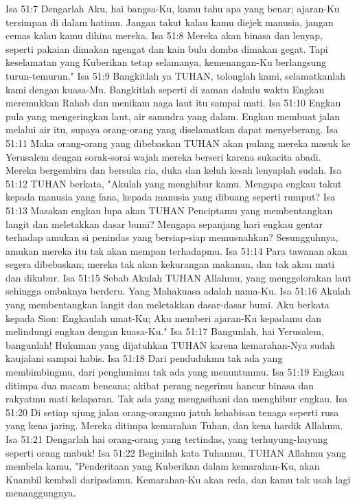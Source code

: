 Isa 51:7  Dengarlah Aku, hai bangsa-Ku, kamu tahu apa yang benar; ajaran-Ku tersimpan di dalam hatimu. Jangan takut kalau kamu diejek manusia, jangan cemas kalau kamu dihina mereka.
Isa 51:8  Mereka akan binasa dan lenyap, seperti pakaian dimakan ngengat dan kain bulu domba dimakan gegat. Tapi keselamatan yang Kuberikan tetap selamanya, kemenangan-Ku berlangsung turun-temurun."
Isa 51:9  Bangkitlah ya TUHAN, tolonglah kami, selamatkanlah kami dengan kuasa-Mu. Bangkitlah seperti di zaman dahulu waktu Engkau meremukkan Rahab dan menikam naga laut itu sampai mati.
Isa 51:10  Engkau pula yang mengeringkan laut, air samudra yang dalam. Engkau membuat jalan melalui air itu, supaya orang-orang yang diselamatkan dapat menyeberang.
Isa 51:11  Maka orang-orang yang dibebaskan TUHAN akan pulang mereka masuk ke Yerusalem dengan sorak-sorai wajah mereka berseri karena sukacita abadi. Mereka bergembira dan bersuka ria, duka dan keluh kesah lenyaplah sudah.
Isa 51:12  TUHAN berkata, "Akulah yang menghibur kamu. Mengapa engkau takut kepada manusia yang fana, kepada manusia yang dibuang seperti rumput?
Isa 51:13  Masakan engkau lupa akan TUHAN Penciptamu yang membentangkan langit dan meletakkan dasar bumi? Mengapa sepanjang hari engkau gentar terhadap amukan si penindas yang bersiap-siap memusnahkan? Sesungguhnya, amukan mereka itu tak akan mempan terhadapmu.
Isa 51:14  Para tawanan akan segera dibebaskan; mereka tak akan kekurangan makanan, dan tak akan mati dan dikubur.
Isa 51:15  Sebab Akulah TUHAN Allahmu, yang menggelorakan laut sehingga ombaknya berderu. Yang Mahakuasa adalah nama-Ku.
Isa 51:16  Akulah yang membentangkan langit dan meletakkan dasar-dasar bumi. Aku berkata kepada Sion: Engkaulah umat-Ku; Aku memberi ajaran-Ku kepadamu dan melindungi engkau dengan kuasa-Ku."
Isa 51:17  Bangunlah, hai Yerusalem, bangunlah! Hukuman yang dijatuhkan TUHAN karena kemarahan-Nya sudah kaujalani sampai habis.
Isa 51:18  Dari pendudukmu tak ada yang membimbingmu, dari penghunimu tak ada yang menuntunmu.
Isa 51:19  Engkau ditimpa dua macam bencana; akibat perang negerimu hancur binasa dan rakyatmu mati kelaparan. Tak ada yang mengasihani dan menghibur engkau.
Isa 51:20  Di setiap ujung jalan orang-orangmu jatuh kehabisan tenaga seperti rusa yang kena jaring. Mereka ditimpa kemarahan Tuhan, dan kena hardik Allahmu.
Isa 51:21  Dengarlah hai orang-orang yang tertindas, yang terhuyung-huyung seperti orang mabuk!
Isa 51:22  Beginilah kata Tuhanmu, TUHAN Allahmu yang membela kamu, "Penderitaan yang Kuberikan dalam kemarahan-Ku, akan Kuambil kembali daripadamu. Kemarahan-Ku akan reda, dan kamu tak usah lagi menanggungnya.
